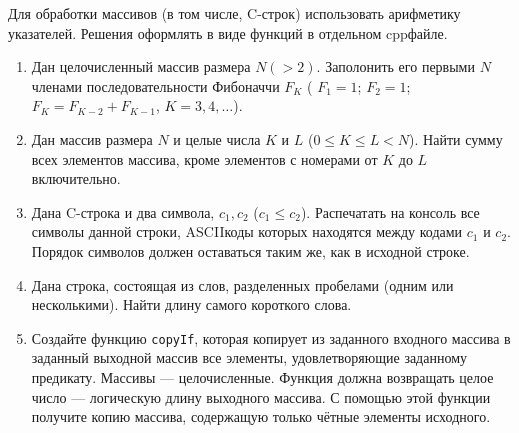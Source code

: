 Для обработки массивов (в том числе, C-строк) использовать
арифметику указателей. Решения оформлять в виде функций в отдельном
cpp\nbdash{}файле.
\begin{enumerate}
    \itemsep=\myitemsep
    \item Дан целочисленный массив размера $N (> 2)$. Заполонить его первыми $N$
    членами последовательности Фибоначчи $F_K$ (%
    $F_1 = 1$; $F_2 = 1$; $F_K = F_{K-2} + F_{K-1}$, $K = 3, 4, \ldots$).
    
    \item Дан массив размера $N$ и целые числа $K$ и $L$
    ($0 \leqslant K \leqslant L < N$). Найти сумму всех элементов массива, кроме
    элементов с номерами от $K$ до $L$ включительно.
    
    \item Дана C-строка и два символа, $c_1, c_2$ ($c_1 \leqslant c_2$).
    Распечатать на консоль все символы данной строки, ASCII\nbdash{}коды которых
    находятся между кодами $c_1$ и $c_2$. Порядок символов должен оставаться
    таким же, как в исходной строке.
    
    \item Дана строка, состоящая из слов, разделенных пробелами (одним
    или несколькими). Найти длину самого короткого слова.
    
    \item Создайте функцию \texttt{copyIf}, которая копирует из
    заданного входного массива в заданный выходной массив все элементы,
    удовлетворяющие заданному предикату. Массивы — целочисленные. Функция должна
    возвращать целое число — логическую длину выходного массива. С помощью этой
    функции получите копию массива, содержащую только чётные элементы исходного.
\end{enumerate}